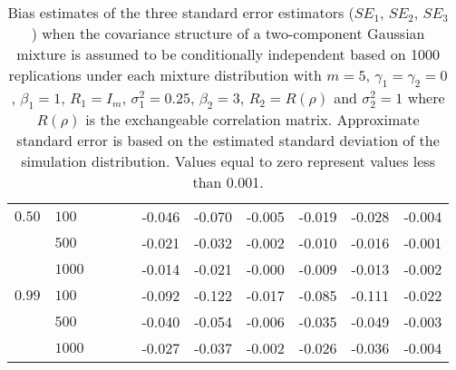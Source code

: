 \begin{table}[ht]
\begin{center}
\begin{tabular}{llccccccccc}
  $0.50$ & $100$ &   &   &   & -0.046 & -0.070 & -0.005 & -0.019 & -0.028 & -0.004 \\ 
    & $500$ &   &   &   & -0.021 & -0.032 & -0.002 & -0.010 & -0.016 & -0.001 \\ 
    & $1000$ &   &   &   & -0.014 & -0.021 & -0.000 & -0.009 & -0.013 & -0.002 \\ 
  $0.99$ & $100$ &   &   &   & -0.092 & -0.122 & -0.017 & -0.085 & -0.111 & -0.022 \\ 
    & $500$ &   &   &   & -0.040 & -0.054 & -0.006 & -0.035 & -0.049 & -0.003 \\ 
    & $1000$ &   &   &   & -0.027 & -0.037 & -0.002 & -0.026 & -0.036 & -0.004 \\ 
   \hline\end{tabular}
\caption{Bias estimates of the three standard error estimators ($SE_1$, $SE_2$, $SE_3$) when the covariance structure of a two-component Gaussian mixture is assumed to be conditionally independent based on 1000 replications under each mixture distribution with $m=5$, $\gamma_1=\gamma_2=0$, $\beta_{1}=1$, $R_1=I_{m}$, $\sigma_1^{2}=0.25$, $\beta_2=3$, $R_2=R(\rho)$ and $\sigma_2^{2}=1$ where $R(\rho)$ is the exchangeable correlation matrix. Approximate standard error is based on the estimated standard deviation of the simulation distribution. Values equal to zero represent values less than 0.001.}
\label{tab:dep2}
\end{center}
\end{table}\clearpage
